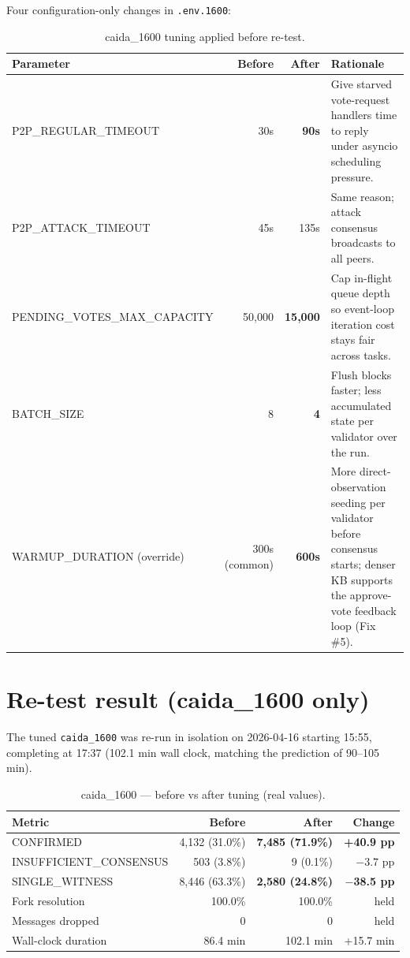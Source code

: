 \documentclass[10pt,a4paper]{article}
\newcommand{\good}[1]{\textcolor{good}{\textbf{#1}}}
\begin{document}
Four configuration-only changes in \texttt{.env.1600}:

\begin{table}[h]
\centering
\caption{caida\_1600 tuning applied before re-test.}
\begin{tabular}{lrrp{7.5cm}}
\toprule
Parameter & Before & After & Rationale \\
\midrule
P2P\_REGULAR\_TIMEOUT & 30s & \good{90s} & Give starved vote-request handlers time to reply under asyncio scheduling pressure. \\
P2P\_ATTACK\_TIMEOUT  & 45s & 135s & Same reason; attack consensus broadcasts to all peers. \\
PENDING\_VOTES\_MAX\_CAPACITY & 50{,}000 & \good{15{,}000} & Cap in-flight queue depth so event-loop iteration cost stays fair across tasks. \\
BATCH\_SIZE & 8 & \good{4} & Flush blocks faster; less accumulated state per validator over the run. \\
WARMUP\_DURATION (override) & 300s (common) & \good{600s} & More direct-observation seeding per validator before consensus starts; denser KB supports the approve-vote feedback loop (Fix \#5). \\
\bottomrule
\end{tabular}
\end{table}

\section{Re-test result (caida\_1600 only)}

The tuned \texttt{caida\_1600} was re-run in isolation on 2026-04-16
starting 15:55, completing at 17:37 (102.1 min wall clock, matching
the prediction of 90--105 min).


\begin{table}[h]
\centering
\caption{caida\_1600 --- before vs after tuning (real values).}
\begin{tabular}{lrrr}
\toprule
Metric & Before & After & Change \\
\midrule

CONFIRMED & 4,132 (31.0\%) & \good{7,485 (71.9\%)} & \good{+40.9 pp} \\
INSUFFICIENT\_CONSENSUS & 503 (3.8\%) & 9 (0.1\%) & $-3.7$ pp \\
SINGLE\_WITNESS & 8,446 (63.3\%) & \good{2,580 (24.8\%)} & \good{$-$38.5 pp} \\
Fork resolution & 100.0\% & 100.0\% & held \\
Messages dropped & 0 & 0 & held \\
Wall-clock duration & 86.4 min & 102.1 min & +15.7 min \\
\bottomrule
\end{tabular}
\end{table}
\end{document}

